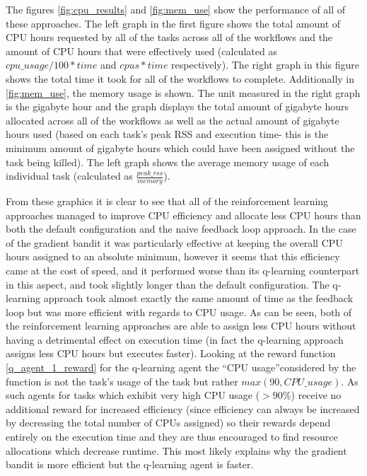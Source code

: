 The figures \ref{fig:cpu_results} and \ref{fig:mem_use} show the performance of all of these approaches. The left graph in the first figure shows the total amount of CPU hours requested by all of the tasks across all of the workflows and the amount of CPU hours that were effectively used (calculated as $cpu\_usage/100*time$ and $cpus*time$ respectively). The right graph in this figure shows the total time it took for all of the workflows to complete. Additionally in \ref{fig:mem_use}, the memory usage is shown. The unit measured in the right graph is the gigabyte hour and the graph displays the total amount of gigabyte hours allocated across all of the workflows as well as the actual amount of gigabyte hours used (based on each task’s peak RSS and execution time- this is the minimum amount of gigabyte hours which could have been assigned without the task being killed). The left graph shows the average memory usage of each individual task (calculated as $\frac{peak\_rss}{memory}$). 

From these graphics it is clear to see that all of the reinforcement learning approaches managed to improve CPU efficiency and allocate less CPU hours than both the default configuration and the naive feedback loop approach. In the case of the gradient bandit it was particularly effective at keeping the overall CPU hours assigned to an absolute minimum, however it seems that this efficiency came at the cost of speed, and it performed worse than its q-learning counterpart in this aspect, and took slightly longer than the default configuration. The q-learning approach took almost exactly the same amount of time as the feedback loop but was more efficient with regards to CPU usage. As can be seen, both of the reinforcement learning approaches are able to assign less CPU hours without having a detrimental effect on execution time (in fact the q-learning approach assigns less CPU hours but executes faster). Looking at the reward function \ref{q_agent_1_reward} for the q-learning agent the “CPU usage”considered by the function is not the task’s usage of the task but rather $max(90,CPU\_usage)$. As such agents for tasks which exhibit very high CPU usage ($>90\%$) receive no additional reward for increased efficiency (since efficiency can always be increased by decreasing the total number of CPUs assigned) so their rewards depend entirely on the execution time and they are thus encouraged to find resource allocations which decrease runtime. This most likely explains why the gradient bandit is more efficient but the q-learning agent is faster.

